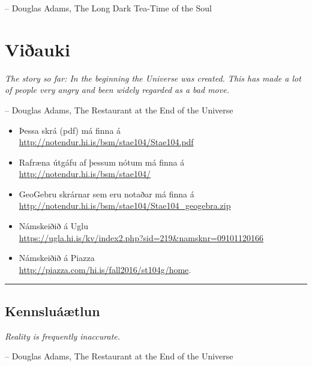 \documentclass[b5paper,11pt,icelandic]{sphinxmanual}
\begin{document}
-- Douglas Adams, The Long Dark Tea-Time of the Soul


\chapter{Viðauki}
\label{vidauki:viauki}\label{vidauki::doc}
\emph{The story so far:
In the beginning the Universe was created.
This has made a lot of people very angry and been widely regarded as a bad move.}

-- Douglas Adams, The Restaurant at the End of the Universe
\begin{itemize}

\item {} 
  Þessa skrá (pdf) má finna á \\ \url{http://notendur.hi.is/bsm/stae104/Stae104.pdf}

\item{} Rafræna útgáfu af þessum nótum má finna á \\
  \url{http://notendur.hi.is/bsm/stae104/}

\item {} 
GeoGebru skrárnar sem eru notaðar má finna á \\
\url{http://notendur.hi.is/bsm/stae104/Stae104_geogebra.zip}

\item {} 
Námskeiðið á Uglu \\
\url{https://ugla.hi.is/kv/index2.php?sid=219\&namsknr=09101120166}

\item {} 
Námskeiðið á Piazza \\ \url{http://piazza.com/hi.is/fall2016/st104g/home}.

\end{itemize}
\newpage

\bigskip\hrule{}\bigskip



\section{Kennsluáætlun}
\label{vidauki:kennsluaaetlun}
\emph{Reality is frequently inaccurate.}

-- Douglas Adams, The Restaurant at the End of the Universe
\end{document}
